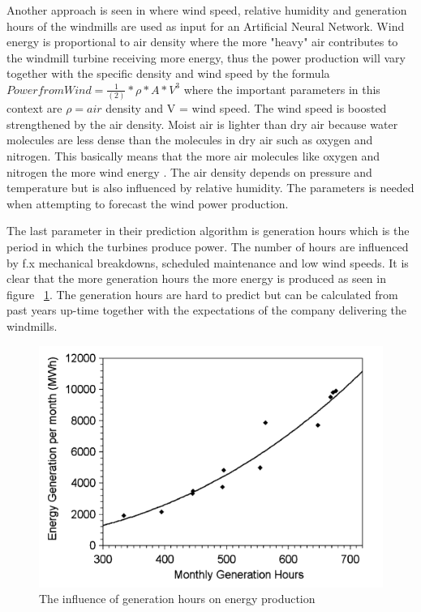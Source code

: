 Another approach is seen in \cite{WindPowerGenerationUsingANN} where wind speed, relative humidity and generation hours of the windmills are used as input for an Artificial Neural Network. Wind energy is proportional to air density where the more "heavy" air contributes to the windmill turbine receiving more energy, thus the power production will vary together with the specific density and wind speed by the formula $Power from Wind=\frac{1}{(2)}*\rho*A*V^3$ where the important parameters in this context are $\rho = air$ density and V = wind speed. The wind speed is boosted strengthened by the air density. Moist air is lighter than dry air because water molecules are less dense than the molecules in dry air such as oxygen and nitrogen. This basically means that the more air molecules like oxygen and nitrogen the more wind energy \cite{AirDensityInForecast}.
The air density depends on pressure and temperature but is also influenced by relative humidity. The parameters is needed when attempting to forecast the wind power production.

The last parameter in their prediction algorithm is generation hours which is the period in which the turbines produce power. The number of hours are influenced by f.x mechanical breakdowns, scheduled maintenance and low wind speeds. It is clear that the more generation hours the more energy is produced as seen in figure ~\ref{fig:energyGenerationFromHours}. The generation hours are hard to predict but can be calculated from past years up-time together with the expectations of the company delivering the windmills.  

\begin{figure}[h!]
\centering
\includegraphics[width=0.8\linewidth,natwidth=898,natheight=587]{billeder/GenerationHourVSGeneration.png}
\caption{The influence of generation hours on energy production \cite{WindPowerGenerationUsingANN}}
\label{fig:energyGenerationFromHours}
\end{figure} 

